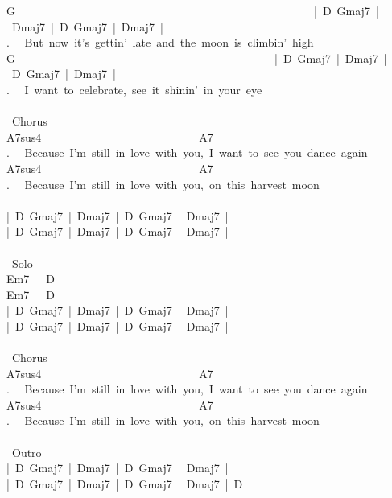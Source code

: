 {G\ \ \ \ \ \ \ \ \ \ \ \ \ \ \ \ \ \ \ \ \ \ \ \ \ \ \ \ \ \ \ \ \ \ \ \ \ \ \ \ \ \ \ \ \ \ \ \ \ \ \ \ \ |\ D\ Gmaj7\ |\ Dmaj7\ |\ D\ Gmaj7\ |\ Dmaj7\ |\\
. \ \ But\ now\ it's\ gettin'\ late\ and\ the\ moon\ is\ climbin'\ high\\
G\ \ \ \ \ \ \ \ \ \ \ \ \ \ \ \ \ \ \ \ \ \ \ \ \ \ \ \ \ \ \ \ \ \ \ \ \ \ \ \ \ \ \ \ \ \ |\ D\ Gmaj7\ |\ Dmaj7\ |\ D\ Gmaj7\ |\ Dmaj7\ |\\
. \ \ I\ want\ to\ celebrate,\ see\ it\ shinin'\ in\ your\ eye\\
\\
\lbrack\ Chorus\rbrack\\
A7sus4\ \ \ \ \ \ \ \ \ \ \ \ \ \ \ \ \ \ \ \ \ \ \ \ \ \ \ \ A7\\
. \ \ Because\ I'm\ still\ in\ love\ with\ you,\ I\ want\ to\ see\ you\ dance\ again\\
A7sus4\ \ \ \ \ \ \ \ \ \ \ \ \ \ \ \ \ \ \ \ \ \ \ \ \ \ \ \ A7\ \ \ \ \ \ \ \ \ \ \ \ \ \ \ \ \ \ \\
. \ \ Because\ I'm\ still\ in\ love\ with\ you,\ on\ this\ harvest\ moon\\
\\
|\ D\ Gmaj7\ |\ Dmaj7\ |\ D\ Gmaj7\ |\ Dmaj7\ |\\
|\ D\ Gmaj7\ |\ Dmaj7\ |\ D\ Gmaj7\ |\ Dmaj7\ |\\
\\
\lbrack\ Solo\rbrack\\
Em7\ \ \ D\\
Em7\ \ \ D\\
|\ D\ Gmaj7\ |\ Dmaj7\ |\ D\ Gmaj7\ |\ Dmaj7\ |\\
|\ D\ Gmaj7\ |\ Dmaj7\ |\ D\ Gmaj7\ |\ Dmaj7\ |\\
\\
\lbrack\ Chorus\rbrack\\
A7sus4\ \ \ \ \ \ \ \ \ \ \ \ \ \ \ \ \ \ \ \ \ \ \ \ \ \ \ \ A7\\
. \ \ Because\ I'm\ still\ in\ love\ with\ you,\ I\ want\ to\ see\ you\ dance\ again\\
A7sus4\ \ \ \ \ \ \ \ \ \ \ \ \ \ \ \ \ \ \ \ \ \ \ \ \ \ \ \ A7\ \ \ \ \ \ \ \ \ \ \ \ \ \ \ \ \ \ \ \\
. \ \ Because\ I'm\ still\ in\ love\ with\ you,\ on\ this\ harvest\ moon\\
\\
\lbrack\ Outro\rbrack\\
|\ D\ Gmaj7\ |\ Dmaj7\ |\ D\ Gmaj7\ |\ Dmaj7\ |\\
|\ D\ Gmaj7\ |\ Dmaj7\ |\ D\ Gmaj7\ |\ Dmaj7\ |\ D\ }
